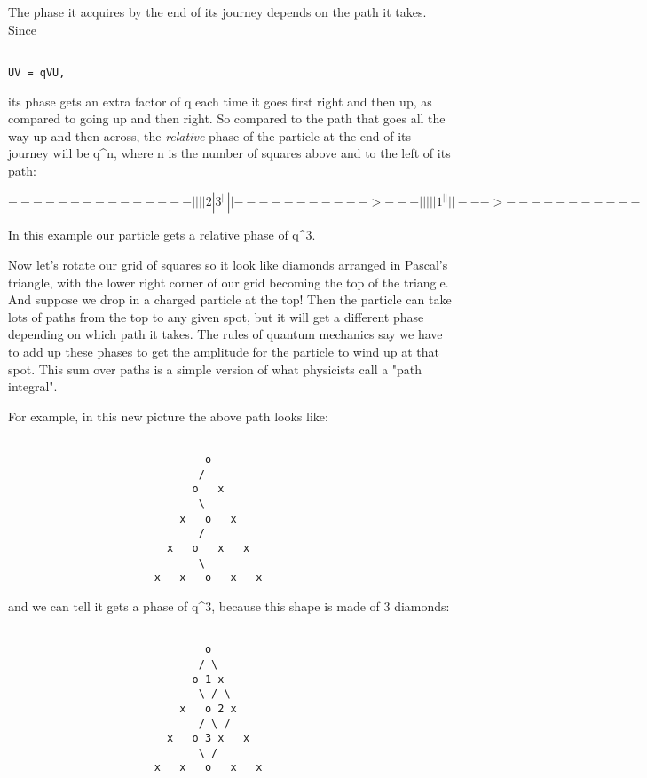The phase it acquires by the end of its journey depends on the path it 
takes.  Since 


\begin{verbatim}

UV = qVU, 
\end{verbatim}
    
its phase gets an extra factor of q each time it goes first right and
then up, as compared to going up and then right.  So compared to the
path that goes all the way up and then across, the \emph{relative} phase 
of the particle at the end of its journey will be q^{n}, where n is the
number of squares above and to the left of its path:


$$

                ---------------
               |       |       |
               |   2   |   3   ^
               |       |       |
               |----------->---|
               |       |       |
               |   1   ^       |
               |       |       | 
                --->-----------
$$
    
In this example our particle gets a relative phase of q^{3}.

Now let's rotate our grid of squares so it look like diamonds arranged
in Pascal's triangle, with the lower right corner of our grid becoming
the top of the triangle.  And suppose we drop in a charged particle at
the top!  Then the particle can take lots of paths from the top to any
given spot, but it will get a different phase depending on which path 
it takes.  The rules of quantum mechanics say we have to add up these
phases to get the amplitude for the particle to wind up at that spot. 
This sum over paths is a simple version of what physicists call a 
"path integral".  

For example, in this new picture the above path looks like:


\begin{verbatim}

                               o
                              / 
                             o   x
                              \   
                           x   o   x
                              /       
                         x   o   x   x
                              \    
                       x   x   o   x   x
\end{verbatim}
    
and we can tell it gets a phase of q^{3}, because this shape is
made of 3 diamonds:


\begin{verbatim}

                               o
                              / \
                             o 1 x
                              \ / \
                           x   o 2 x
                              / \ / 
                         x   o 3 x   x
                              \ /
                       x   x   o   x   x
\end{verbatim}
    
